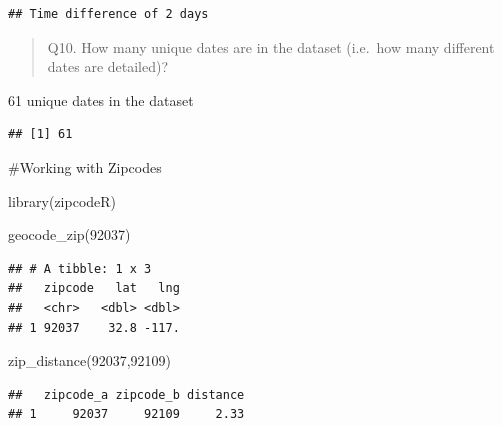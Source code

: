 \documentclass[
]{article}
\newenvironment{Shaded}{\begin{snugshade}}{\end{snugshade}}
\newcommand{\FunctionTok}[1]{\textcolor[rgb]{0.00,0.00,0.00}{#1}}
\newcommand{\NormalTok}[1]{#1}
\newcommand{\OtherTok}[1]{\textcolor[rgb]{0.56,0.35,0.01}{#1}}
\newcommand{\SpecialCharTok}[1]{\textcolor[rgb]{0.00,0.00,0.00}{#1}}
\newcommand{\StringTok}[1]{\textcolor[rgb]{0.31,0.60,0.02}{#1}}
\begin{document}
\begin{verbatim}
## Time difference of 2 days
\end{verbatim}

\begin{quote}
Q10. How many unique dates are in the dataset (i.e.~how many different
dates are detailed)?
\end{quote}

61 unique dates in the dataset

\begin{Shaded}
\end{Shaded}

\begin{verbatim}
## [1] 61
\end{verbatim}

\#Working with Zipcodes

\begin{Shaded}
\begin{Highlighting}[]
\FunctionTok{library}\NormalTok{(zipcodeR)}
\end{Highlighting}
\end{Shaded}

\begin{Shaded}
\begin{Highlighting}[]
\FunctionTok{geocode\_zip}\NormalTok{(}\StringTok{\textquotesingle{}92037\textquotesingle{}}\NormalTok{)}
\end{Highlighting}
\end{Shaded}

\begin{verbatim}
## # A tibble: 1 x 3
##   zipcode   lat   lng
##   <chr>   <dbl> <dbl>
## 1 92037    32.8 -117.
\end{verbatim}

\begin{Shaded}
\begin{Highlighting}[]
\FunctionTok{zip\_distance}\NormalTok{(}\StringTok{\textquotesingle{}92037\textquotesingle{}}\NormalTok{,}\StringTok{\textquotesingle{}92109\textquotesingle{}}\NormalTok{)}
\end{Highlighting}
\end{Shaded}

\begin{verbatim}
##   zipcode_a zipcode_b distance
## 1     92037     92109     2.33
\end{verbatim}
\end{document}
